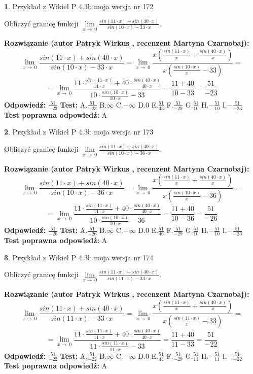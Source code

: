 \documentclass[12pt, a4paper]{article}
\theoremstyle{definition} %
\newtheorem{zad}{}
\newcommand{\zadStart}[1]{\begin{zad}#1\newline}
\newcommand{\zadStop}{\end{zad}}
\newcommand{\rozwStart}[2]{\noindent \textbf{Rozwiązanie (autor #1 , recenzent #2): }\newline}
\newcommand{\rozwStop}{\newline}
\newcommand{\odpStart}{\noindent \textbf{Odpowiedź:}\newline}
\newcommand{\odpStop}{\newline}
\newcommand{\testStart}{\noindent \textbf{Test:}\newline}
\newcommand{\testStop}{\newline}
\newcommand{\kluczStart}{\noindent \textbf{Test poprawna odpowiedź:}\newline}
\newcommand{\kluczStop}{\newline}
\begin{document}
\zadStart{Przykład z Wikieł P 4.3b moja wersja nr 172}


Obliczyć granicę funkcji $\lim\limits_{x\to\ 0}\frac{sin(11 \cdot x)+sin(40 \cdot x)}{sin(10 \cdot x)-33 \cdot x}$.
\zadStop
\rozwStart{Patryk Wirkus}{Martyna Czarnobaj}
$$\lim\limits_{x\to\ 0}\frac{sin(11 \cdot x)+sin(40 \cdot x)}{sin(10 \cdot x)-33 \cdot x}=\lim\limits_{x\to\ 0}\frac{x(\frac{sin(11 \cdot x)}{x}+\frac{sin(40 \cdot x)}{x})}{x(\frac{sin(10 \cdot x)}{x}-33)}=$$
$$=\lim\limits_{x\to\ 0}\frac{11 \cdot \frac{sin(11 \cdot x)}{11 \cdot x}+40 \cdot \frac{sin(40 \cdot x)}{40 \cdot x}}{10 \cdot \frac{sin(10 \cdot x)}{10 \cdot x}-33}=\frac{11+40}{10-33} = \frac{51}{-23}$$
\rozwStop
\odpStart
$\frac{51}{-23}$
\odpStop
\testStart
A.$\frac{51}{-23}$
B.$\infty$
C.$-\infty$
D.$0$
E.$\frac{51}{43}$
F.$\frac{51}{-29}$
G.$\frac{51}{10}$
H.$-\frac{51}{10}$
I.$-\frac{51}{-23}$
\testStop
\kluczStart
A
\kluczStop



\zadStart{Przykład z Wikieł P 4.3b moja wersja nr 173}


Obliczyć granicę funkcji $\lim\limits_{x\to\ 0}\frac{sin(11 \cdot x)+sin(40 \cdot x)}{sin(10 \cdot x)-36 \cdot x}$.
\zadStop
\rozwStart{Patryk Wirkus}{Martyna Czarnobaj}
$$\lim\limits_{x\to\ 0}\frac{sin(11 \cdot x)+sin(40 \cdot x)}{sin(10 \cdot x)-36 \cdot x}=\lim\limits_{x\to\ 0}\frac{x(\frac{sin(11 \cdot x)}{x}+\frac{sin(40 \cdot x)}{x})}{x(\frac{sin(10 \cdot x)}{x}-36)}=$$
$$=\lim\limits_{x\to\ 0}\frac{11 \cdot \frac{sin(11 \cdot x)}{11 \cdot x}+40 \cdot \frac{sin(40 \cdot x)}{40 \cdot x}}{10 \cdot \frac{sin(10 \cdot x)}{10 \cdot x}-36}=\frac{11+40}{10-36} = \frac{51}{-26}$$
\rozwStop
\odpStart
$\frac{51}{-26}$
\odpStop
\testStart
A.$\frac{51}{-26}$
B.$\infty$
C.$-\infty$
D.$0$
E.$\frac{51}{46}$
F.$\frac{51}{-29}$
G.$\frac{51}{10}$
H.$-\frac{51}{10}$
I.$-\frac{51}{-26}$
\testStop
\kluczStart
A
\kluczStop



\zadStart{Przykład z Wikieł P 4.3b moja wersja nr 174}


Obliczyć granicę funkcji $\lim\limits_{x\to\ 0}\frac{sin(11 \cdot x)+sin(40 \cdot x)}{sin(11 \cdot x)-33 \cdot x}$.
\zadStop
\rozwStart{Patryk Wirkus}{Martyna Czarnobaj}
$$\lim\limits_{x\to\ 0}\frac{sin(11 \cdot x)+sin(40 \cdot x)}{sin(11 \cdot x)-33 \cdot x}=\lim\limits_{x\to\ 0}\frac{x(\frac{sin(11 \cdot x)}{x}+\frac{sin(40 \cdot x)}{x})}{x(\frac{sin(11 \cdot x)}{x}-33)}=$$
$$=\lim\limits_{x\to\ 0}\frac{11 \cdot \frac{sin(11 \cdot x)}{11 \cdot x}+40 \cdot \frac{sin(40 \cdot x)}{40 \cdot x}}{11 \cdot \frac{sin(11 \cdot x)}{11 \cdot x}-33}=\frac{11+40}{11-33} = \frac{51}{-22}$$
\rozwStop
\odpStart
$\frac{51}{-22}$
\odpStop
\testStart
A.$\frac{51}{-22}$
B.$\infty$
C.$-\infty$
D.$0$
E.$\frac{51}{44}$
F.$\frac{51}{-29}$
G.$\frac{51}{11}$
H.$-\frac{51}{11}$
I.$-\frac{51}{-22}$
\testStop
\kluczStart
A
\kluczStop
\end{document}

